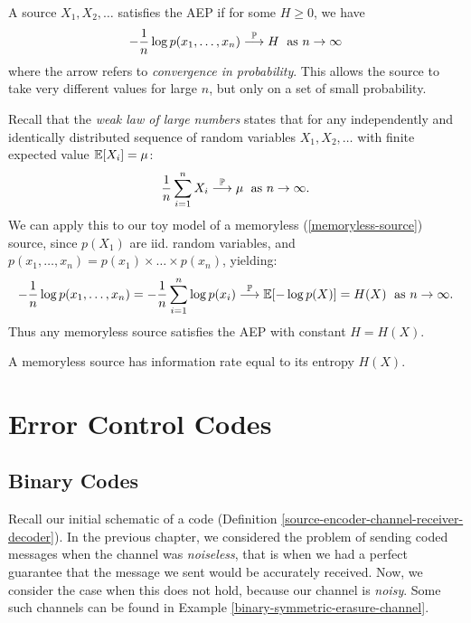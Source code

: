 \documentclass{article}
\begin{document}
\begin{definition}
    A source $X_1, X_2, \dots$
    satisfies the AEP if for some $H \geq 0$, we have
    \[
	- \frac{1}{n} \log p(x_1, \dots, x_n)
	\stackrel{\mathbb{P}}{\longrightarrow} H
	\; \text{ as $n \to \infty$}
	\]
	where the arrow refers to \textit{convergence in probability}.
	This allows the source to take very different values for large $n$,
	but only on a set of small probability.
\end{definition}

\begin{remark}
	\label{weak-law-of-large-numbers}
    Recall that the \textit{weak law of large numbers} states that for any
    independently and identically distributed sequence of random variables
    $X_1, X_2, \dots$
    with finite expected value $\mathbb{E}[X_i] = \mu$:
    \[
	\frac{1}{n} \sum_{i=1}^n X_i
	\stackrel{\mathbb{P}}{\longrightarrow} \mu
	\; \text{ as $n \to \infty$}.
	\]
	We can apply this to our toy model of a memoryless (\ref{memoryless-source})
	source, since $p(X_1)$ are iid. random variables,
	and $p(x_1, \dots, x_n) = p(x_1) \times \dots \times p(x_n)$, yielding:
	\[
	- \frac{1}{n} \log p(x_1, \dots, x_n) =
	- \frac{1}{n} \sum_{i=1}^n \log p(x_i)
	\stackrel{\mathbb{P}}{\longrightarrow} \mathbb{E}[-\log p(X)] = H(X)
	\; \text{ as $n \to \infty$}.
	\]
	Thus any memoryless source satisfies the AEP with constant $H = H(X)$.
\end{remark}

\begin{corollary}
    A memoryless source has information rate equal to its entropy $H(X)$.
\end{corollary}


\pagebreak
\section{Error Control Codes}
\subsection{Binary Codes}

Recall our initial schematic of a code
(Definition \ref{source-encoder-channel-receiver-decoder}).
In the previous chapter, we considered the problem of sending coded messages
when the channel was \textit{noiseless},
that is when we had a perfect guarantee that
the message we sent would be accurately received.
Now, we consider the case when this does not hold,
because our channel is \textit{noisy}.
Some such channels can be found in Example \ref{binary-symmetric-erasure-channel}.
\end{document}

